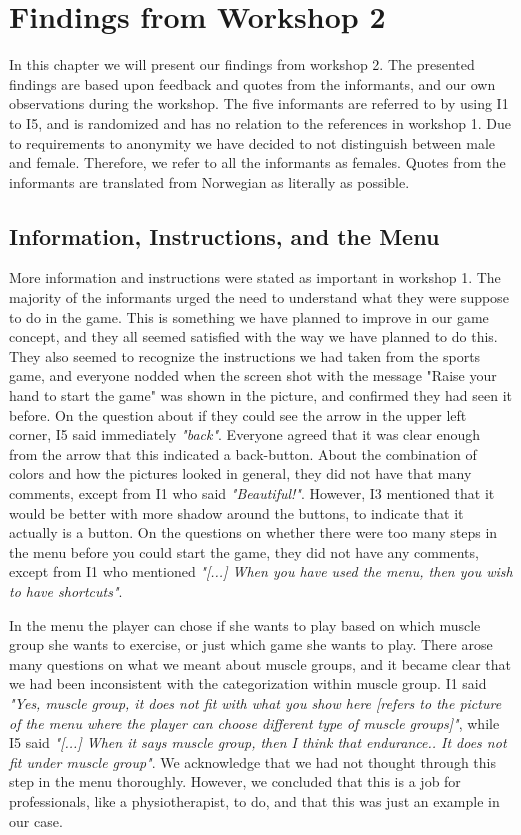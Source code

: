 \chapter{Findings from Workshop 2}

In this chapter we will present our findings from workshop 2. The presented findings are based upon feedback and quotes from the informants, and our own observations during the workshop. The five informants are referred to by using I1 to I5, and is randomized and has no relation to the references in workshop 1. Due to requirements to anonymity we have decided to not distinguish between male and female. Therefore, we refer to all the informants as females. Quotes from the informants are translated from Norwegian as literally as possible. 

\section{Information, Instructions, and the Menu}

More information and instructions were stated as important in workshop 1. The majority of the informants urged the need to understand what they were suppose to do in the game. This is something we have planned to improve in our game concept, and they all seemed satisfied with the way we have planned to do this. They also seemed to recognize the instructions we had taken from the sports game, and everyone nodded  when the screen shot with the message "Raise your hand to start the game" was shown in the picture, and confirmed they had seen it before. On the question about if they could see the arrow in the upper left corner, I5 said immediately \emph{"back"}. Everyone agreed that it was clear enough from the arrow that this indicated a back-button. About the combination of colors and how the pictures looked in general, they did not have that many comments, except from I1 who said \emph{"Beautiful!"}.  However, I3 mentioned that it would be better with more shadow around the buttons, to indicate that it actually is a button. On the questions on whether there were too many steps in the menu before you could start the game, they did not have any comments, except from I1 who mentioned \emph{"[...] When you have used the menu, then you wish to have shortcuts"}. 

In the menu the player can chose if she wants to play based on which muscle group she wants to exercise, or just which game she wants to play. There arose many questions on what we meant about muscle groups, and it became clear that we had been inconsistent with the categorization within muscle group. I1 said \emph{"Yes, muscle group, it does not fit with what you show here [refers to the picture of the menu where the player can choose different type of muscle groups]"}, while I5 said \emph{"[...] When it says muscle group, then I think that endurance.. It does not fit under muscle group"}. We acknowledge that we had not thought through this step in the menu thoroughly. However, we concluded that this is a job for professionals, like a physiotherapist, to do, and that this was just an example in our case.  


